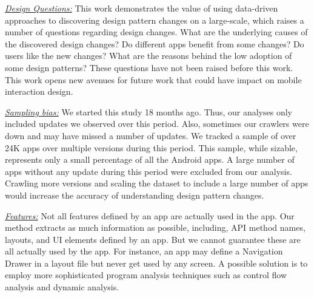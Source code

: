 \par 

\underline{\textit{Design Questions:}} This work demonstrates the value of using data-driven approaches to discovering design pattern changes on a large-scale, which raises a number of questions regarding design changes. 
What are the underlying causes of the discovered design changes? 
Do different apps benefit from some changes? Do users like the new changes? 
What are the reasons behind the low adoption of some design patterns?
These questions have not been raised before this work. 
This work opens new avenues for future work that could have impact on mobile interaction design.

\underline{\textit{Sampling bias:}} We started this study 18 months ago. 
Thus, our analyses only included updates we observed over this period. 
Also, sometimes our crawlers were down and may have missed a number of updates. 
We tracked a sample of over 24K apps over multiple versions during this period. 
This sample, while sizable, represents only a small percentage of all the Android apps. 
A large number of apps without any update during this period were excluded from our analysis. 
Crawling more versions and scaling the dataset to include a large number of apps would increase the accuracy of understanding design pattern changes.

\underline{\textit{Features:}} Not all features defined by an app are actually used in the app. 
Our method extracts as much information as possible, including, API method names, layouts, and UI elements defined by an app. 
But we cannot guarantee these are all actually used by the app. 
For instance, an app may define a Navigation Drawer in a layout file but never get used by any screen. 
A possible solution is to employ more sophisticated program analysis techniques such as control flow analysis and dynamic analysis.

